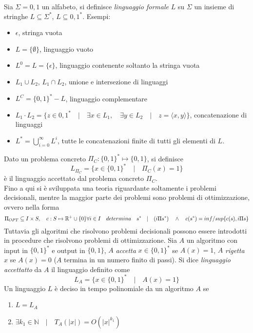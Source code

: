 \documentclass[a4paper,portrait,12pt]{article}
\theoremstyle{definition}
\begin{document}
Sia $\Sigma = {0,1}$ un alfabeto, si definisce \textit{linguaggio formale} $L$ su $\Sigma$
un insieme di stringhe $L \subseteq \Sigma^*$, $L \subseteq {0,1}^*$. Esempi:
\begin{itemize}
	\item $\epsilon$, stringa vuota
	\item $L = \{\emptyset\}$, linguaggio vuoto
	\item $L^0 = L = \{\epsilon\}$, linguaggio contenente soltanto la stringa vuota
	\item $L_1 \cup L_2$, $L_1 \cap L_2$, unione e intersezione di linguaggi
	\item $L^C = \{0,1\}^* - L$, linguaggio complementare
	\item $L_1\cdot L_2 = \{z \in {0,1}^* \quad | \quad \exists x \in L_1,\quad \exists y \in L_2 \quad | 
		\quad z = \langle x,y \rangle\}$, concatenazione di linguaggi
	\item $L^* = \bigcup_{i = 0}^{\infty} L^i$, tutte le concatenazioni finite di tutti gli elementi di $L$.
\end{itemize}
Dato un problema concreto $\Pi_C : \{0,1\}^* \mapsto \{0,1\}$, si definisce
\begin{equation}
L_{\Pi_C} = \{x \in \{0,1\}^* \quad | \quad \Pi_C (x) = 1\}
\end{equation}
è il linguaggio accettato dal problema concreto $\Pi_C$.\\
Fino a qui si è sviluppata una teoria riguardante soltamente i problemi decisionali, mentre la maggior parte dei problemi
sono problemi di ottimizzazione, ovvero nella forma
\begin{equation}
\Pi_{OPT} \subseteq I \times S, \quad c : S \mapsto \mathbb{R}^+ \cup \{0\}\\
\forall i \in I \quad determina \quad s^*\quad |\quad (i\Pi s^*) \quad\wedge\quad c(s^*) = inf/sup\{c(s),i\Pi s\}
\end{equation}
Tuttavia gli algoritmi che risolvono problemi decisionali possono essere introdotti in procedure che risolvono problemi 
di ottimizzazione.
Sia $A$ un algoritmo con input in $\{0,1\}^*$ e output in $\{0,1\}$, $A$ \textit{accetta} $x \in \{0,1\}^*$ 
se $A(x) = 1$, $A$ \textit{rigetta} $x$ se $A(x) = 0$ ($A$ termina in un numero finito di passi).
Si dice \textit{linguaggio accettatto} da $A$ il linguaggio definito come
\begin{equation}
L_A = \{x \in \{0,1\}^* \quad | \quad A(x) = 1\}
\end{equation}
Un linguaggio $L$ è deciso in tempo polinomiale da un algoritmo $A$ se
\begin{enumerate}
	\item $L = L_A$
	\item $\exists k_1 \in \mathbb{N} \quad | \quad T_A(\left|x\right|) = O(\left|x\right|^{k_1})$
\end{enumerate}
\end{document}
